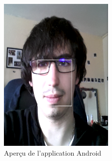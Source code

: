 \begin{figure}[h!]
	\centering
	\includegraphics[width=0.5\textwidth]{data/appAndroid.png}
	\caption{Aperçu de l'application Android}
\end{figure}

